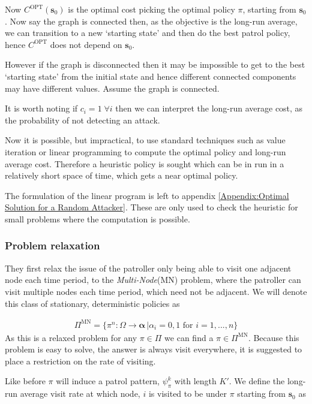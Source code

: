 \documentclass[a4paper,10pt]{article}
\theoremstyle{definition}
\theoremstyle{definition}
\theoremstyle{remark}
\theoremstyle{definition}
\begin{document}
Now $C^{\text{OPT}}(\bm{s}_{0})$ is the optimal cost picking the optimal policy $\pi$, starting from $\bm{s}_{0}$. Now say the graph is connected then, as the objective is the long-run average, we can transition to a new `starting state' and then do the best patrol policy, hence $C^{\text{OPT}}$ does not depend on $\bm{s}_{0}$.

However if the graph is disconnected then it may be impossible to get to the best `starting state' from the initial state and hence different connected components may have different values. Assume the graph is connected.

It is worth noting if $c_{i}=1 \; \forall i$ then we can interpret the long-run average cost, as the probability of not detecting an attack.

Now it is possible, but impractical, to use standard techniques such as value iteration or linear programming to compute the optimal policy and long-run average cost. Therefore a heuristic policy is sought which can be in run in a relatively short space of time, which gets a near optimal policy.

The formulation of the linear program is left to appendix \ref{Appendix:Optimal Solution for a Random Attacker}. These are only used to check the heuristic for small problems where the computation is possible.


\subsubsection{Problem relaxation}
They first relax the issue of the patroller only being able to visit one adjacent node each time period, to the \textit{Multi-Node}(MN) problem, where the patroller can visit multiple nodes each time period, which need not be adjacent. We will denote this class of stationary, deterministic policies as

\begin{align*}
\Pi^{\text{MN}}=\{\pi^{n}: \Omega \rightarrow \bm{\alpha} \, | \alpha_{i}=0,1 \text{ for } i=1,...,n \}
\end{align*}
As this is a relaxed problem for any $\pi \in \Pi$ we can find a $\pi \in \Pi^{\text{MN}}$. Because this problem is easy to solve, the answer is always visit everywhere, it is suggested to place a restriction on the rate of visiting.

Like before $\pi$ will induce a patrol pattern, $\psi^{k}_{\pi}$ with length $K'$. We define the long-run average visit rate at which node, $i$ is visited to be under $\pi$ starting from $\bm{s}_{0}$ as
\end{document}
